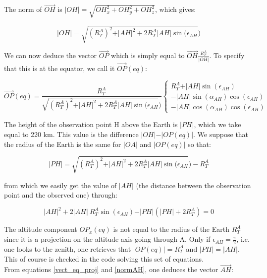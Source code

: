 \documentclass[draft,jgrga]{agutexSI}
\begin{document}
\begin{article}
The norm of $\overrightarrow{OH}$ is $\vert OH \vert = \sqrt{OH_x^2+OH_y^2+OH_z^2}$, which gives:

\begin{equation}
\vert OH \vert = \sqrt{(R_T^A)^2+\vert AH \vert^2+2R_T^A \vert AH \vert \sin(\epsilon_{AH}})
\end{equation}

We can now deduce the vector $\overrightarrow{OP}$ which is simply equal to $\overrightarrow{OH}\frac{R_T^A}{\vert OH \vert}$. To specify that this is at the equator, we call it  $\overrightarrow{OP}(eq)$:

\begin{equation}
\label{OP}
\overrightarrow{OP}(eq)=\frac{R_T^A}{\sqrt{(R_T^A)^2+\vert AH \vert^2+2R_T^A \vert AH \vert \sin(\epsilon_{AH}})}
\left\{ \begin{array}{c}
R_T^A+\vert AH \vert\sin(\epsilon_{AH})\\
-\vert AH \vert\sin(\alpha_{AH})\cos(\epsilon_{AH}) \\
-\vert AH \vert\cos(\alpha_{AH}) \cos(\epsilon_{AH})
\end{array} \right.
\end{equation}

The height of the observation point H above the Earth is $\vert PH \vert$, which we take equal to 220 km. This value is the difference $\vert OH \vert - \vert OP(eq) \vert$. We suppose that the radius of the Earth is the same for $\vert OA \vert$ and $\vert OP(eq) \vert$ so that:

\begin{equation}
\vert PH \vert = \sqrt{(R_T^A)^2+\vert AH \vert^2+2R_T^A \vert AH \vert \sin(\epsilon_{AH}}) - R_T^A
\end{equation}

from which we easily get the value of $\vert AH \vert$ (the distance between the observation point and the observed one) through:

\begin{equation}
\vert AH \vert^2 + 2\vert AH \vert\ R_T^A\sin(\epsilon_{AH}) -\vert PH \vert(\vert PH \vert+2R_T^A)  = 0
\label{normAH}
\end{equation}

The altitude component $OP_x(eq)$ is not equal to the radius of the Earth $R_T^A$ since it is a projection on the altitude axis going through A. Only if $\epsilon_{AH}=\frac{\pi}{2}$, i.e. one looks to the zenith, one retrieves that $\vert OP(eq) \vert = R_T^A$ and $\vert PH \vert = \vert AH \vert$. This of course is checked in the code solving this set of equations.\\
From equations \ref{vect_eq_proj} and \ref{normAH}, one deduces the vector $\overrightarrow{AH}$:


\end{article}
\end{document}
